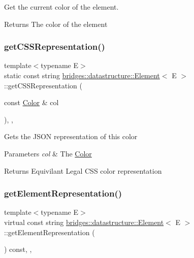 Get the current color of the element. 

\begin{DoxyReturn}{Returns}
The color of the element 
\end{DoxyReturn}
\mbox{\label{classbridges_1_1datastructure_1_1_element_afc6de63b836064024721d72b7ffa52bf}} 
\subsubsection{\texorpdfstring{get\+C\+S\+S\+Representation()}{getCSSRepresentation()}}
{\footnotesize\ttfamily template$<$typename E$>$ \\
static const string \hyperlink{classbridges_1_1datastructure_1_1_element}{bridges\+::datastructure\+::\+Element}$<$ E $>$\+::get\+C\+S\+S\+Representation (\begin{DoxyParamCaption}\item[{const \hyperlink{classbridges_1_1datastructure_1_1_color}{Color} \&}]{col }\end{DoxyParamCaption})\hspace{0.3cm}{\ttfamily [inline]}, {\ttfamily [static]}, {\ttfamily [protected]}}

Gets the J\+S\+ON representation of this color


\begin{DoxyParams}{Parameters}
{\em col} & The \hyperlink{classbridges_1_1datastructure_1_1_color}{Color} \\
\hline
\end{DoxyParams}
\begin{DoxyReturn}{Returns}
Equivilant Legal C\+SS color representation 
\end{DoxyReturn}
\mbox{\label{classbridges_1_1datastructure_1_1_element_a285fc51d6dfcb8bff2d72f7e4addfe6d}} 
\subsubsection{\texorpdfstring{get\+Element\+Representation()}{getElementRepresentation()}}
{\footnotesize\ttfamily template$<$typename E$>$ \\
virtual const string \hyperlink{classbridges_1_1datastructure_1_1_element}{bridges\+::datastructure\+::\+Element}$<$ E $>$\+::get\+Element\+Representation (\begin{DoxyParamCaption}{ }\end{DoxyParamCaption}) const\hspace{0.3cm}{\ttfamily [inline]}, {\ttfamily [protected]}, {\ttfamily [virtual]}}

